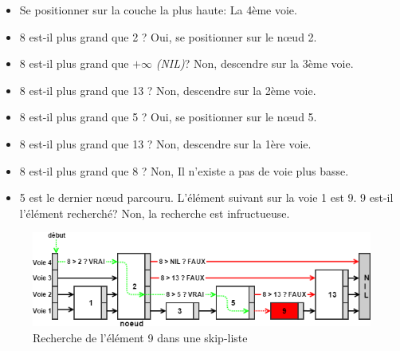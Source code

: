 \documentclass[hidelinks,a4paper, 12pt]{article}
\begin{document}
	\begin{itemize}
		\item Se positionner sur la couche la plus haute: La 4ème voie.
		\item 8 est-il plus grand que 2 ? Oui, se positionner sur le nœud 2.
		\item 8 est-il plus grand que $+\infty$ \textit{(NIL)}? Non, descendre sur la 3ème voie.
		\item 8 est-il plus grand que 13  ? Non, descendre sur la 2ème voie.
		\item 8 est-il plus grand que 5 ? Oui, se positionner sur le nœud 5.
		\item 8 est-il plus grand que 13 ? Non, descendre sur la 1ère voie.
		\item 8 est-il plus grand que 8 ? Non, Il n'existe a pas de voie plus basse.
		\item 5 est le dernier nœud parcouru. L'élément suivant sur la voie 1 est 9. 9 est-il l'élément recherché? Non, la recherche est infructueuse.
	\end{itemize}
	\begin{figure}[h]
		\includegraphics[width=\textwidth]{img/search2}
		\caption{Recherche de l'élément 9 dans une skip-liste}
		\label{SkipSearch2}
	\end{figure}
	
	
	\newpage
\end{document}
